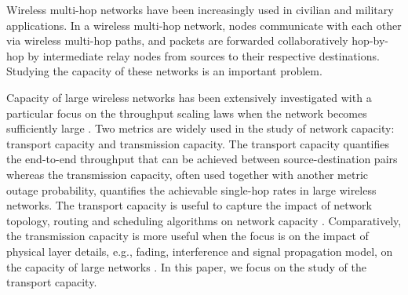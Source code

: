 \documentclass[english]{IEEEtran}
\theoremstyle{plain}
\theoremstyle{plain}
\theoremstyle{plain}
\theoremstyle{remark}
\begin{document}
Wireless multi-hop networks have been increasingly used in civilian
and military applications. In a wireless multi-hop network, nodes
communicate with each other via wireless multi-hop paths, and packets
are forwarded collaboratively hop-by-hop by intermediate relay nodes
from sources to their respective destinations. Studying the capacity
of these networks is an important problem. 

Capacity of large wireless networks has been extensively investigated
with a particular focus on the throughput scaling laws when the network
becomes sufficiently large \cite{Chau11Capacity,Cho06Capacity,Dousse06On,Franceschetti07Closing,Grossglauser02Mobility,Gupta00Capacity,Gupta00Internets,Hu10A,Kulkarni04A,Li09Impacts,Xie04A}.
Two metrics are widely used in the study of network capacity: transport
capacity and transmission capacity. The transport capacity quantifies
the end-to-end throughput that can be achieved between source-destination
pairs whereas the transmission capacity, often used together with
another metric\emph{ }outage probability, quantifies the achievable
single-hop rates in large wireless networks. The transport capacity
is useful to capture the impact of network topology, routing and scheduling
algorithms on network capacity \cite{Alfano09Capacity,Chau11Capacity,Cho06Capacity,Dousse06On,Franceschetti07Closing,Grossglauser02Mobility,Gupta00Capacity,Hu10A,Kulkarni04A,Li09Impacts,Li11The,Yang12Capacity}.
Comparatively, the transmission capacity is more useful when the focus
is on the impact of physical layer details, e.g., fading, interference
and signal propagation model, on the capacity of large networks \cite{Andrews10Random,Ganti11High,Ganti09Interference,Weber10An,Baccelli09Stochastic}.
In this paper, we focus on the study of the transport capacity.
\end{document}
